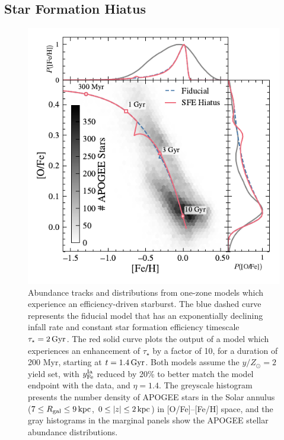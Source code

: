 \documentclass[twocolumn,twocolappendix,linenumbers]{aastex631}
\newcommand{\yZ}[1]{$y/Z_\odot=#1$}
\newcommand{\kpc}{\,{\rm kpc}}
\begin{document}
\subsection{Star Formation Hiatus}
\label{sec:sfe-hiatus}

\begin{figure}
    \centering
    \includegraphics{figures/onezone_sfe_hiatus.pdf}
    \caption{Abundance tracks and distributions from one-zone models which experience an efficiency-driven starburst. The blue dashed curve represents the fiducial model that has an exponentially declining infall rate and constant star formation efficiency timescale $\tau_\star=2\,{\rm Gyr}$. The red solid curve plots the output of a model which experiences an enhancement of $\tau_\star$ by a factor of 10, for a duration of 200 Myr, starting at $t=1.4\,{\rm Gyr}$. Both models assume the \yZ{2} yield set, with $y_{\rm Fe}^{\rm Ia}$ reduced by 20\% to better match the model endpoint with the data, and $\eta=1.4$. The greyscale histogram presents the number density of APOGEE stars in the Solar annulus ($7\leq R_{\rm gal}\leq 9\kpc$, $0\leq|z|\leq2\kpc$) in [O/Fe]--[Fe/H] space, and the gray histograms in the marginal panels show the APOGEE stellar abundance distributions.}
    \label{fig:onezone-sfe-hiatus}
\end{figure}
\end{document}
